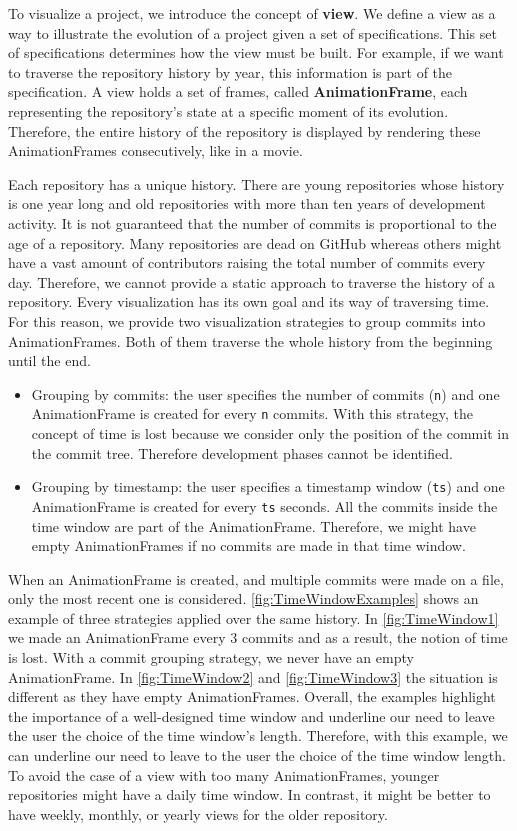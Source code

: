 To visualize a project, we introduce the concept of \textbf{view}. We define a view as a way to illustrate the evolution of a project given a set of specifications. This set of specifications determines how the view must be built. For example, if we want to traverse the repository history by year, this information is part of the specification. A view holds a set of frames, called \textbf{AnimationFrame}, each representing the repository's state at a specific moment of its evolution. Therefore, the entire history of the repository is displayed by rendering these AnimationFrames consecutively, like in a movie. 

Each repository has a unique history. There are young repositories whose history is one year long and old repositories with more than ten years of development activity. It is not guaranteed that the number of commits is proportional to the age of a repository. Many repositories are dead on GitHub whereas others might have a vast amount of contributors raising the total number of commits every day. Therefore, we cannot provide a static approach to traverse the history of a repository. 
Every visualization has its own goal and its way of traversing time. For this reason, we provide two visualization strategies to group commits into AnimationFrames. Both of them traverse the whole history from the beginning until the end.
\begin{itemize}
    \item{Grouping by commits}: the user specifies the number of commits (\texttt{n}) and one AnimationFrame is created for every \texttt{n} commits. With this strategy, the concept of time is lost because we consider only the position of the commit in the commit tree. Therefore development phases cannot be identified. 
    \item{Grouping by timestamp}: the user specifies a timestamp window (\texttt{ts}) and one AnimationFrame is created for every \texttt{ts} seconds. All the commits inside the time window are part of the AnimationFrame. Therefore, we might have empty AnimationFrames if no commits are made in that time window.
\end{itemize}

When an AnimationFrame is created, and multiple commits were made on a file, only the most recent one is considered. 
\autoref{fig:TimeWindowExamples} shows an example of three strategies applied over the same history. In \autoref{fig:TimeWindow1} we made an AnimationFrame every 3 commits and as a result, the notion of time is lost. With a commit grouping strategy, we never have an empty AnimationFrame. In \autoref{fig:TimeWindow2} and \autoref{fig:TimeWindow3} the situation is different as they have empty AnimationFrames.
Overall, the examples highlight the importance of a well-designed time window and underline our need to leave the user the choice of the time window's length. Therefore, with this example, we can underline our need to leave to the user the choice of the time window length. To avoid the case of a view with too many AnimationFrames, younger repositories might have a daily time window. In contrast, it might be better to have weekly, monthly, or yearly views for the older repository. 

